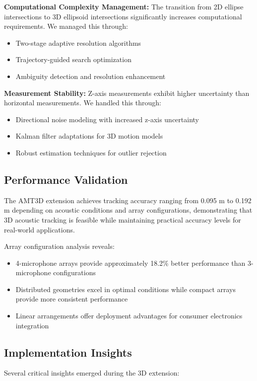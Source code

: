 \documentclass[a4paper]{article}
\begin{document}
{\bf Computational Complexity Management:} The transition from 2D ellipse intersections to 3D ellipsoid intersections significantly increases computational requirements. We managed this through:
\begin{itemize}
\item Two-stage adaptive resolution algorithms
\item Trajectory-guided search optimization
\item Ambiguity detection and resolution enhancement
\end{itemize}

{\bf Measurement Stability:} Z-axis measurements exhibit higher uncertainty than horizontal measurements. We handled this through:
\begin{itemize}
\item Directional noise modeling with increased z-axis uncertainty
\item Kalman filter adaptations for 3D motion models
\item Robust estimation techniques for outlier rejection
\end{itemize}

\subsection{Performance Validation}

The AMT3D extension achieves tracking accuracy ranging from 0.095 m to 0.192 m depending on acoustic conditions and array configurations, demonstrating that 3D acoustic tracking is feasible while maintaining practical accuracy levels for real-world applications.

Array configuration analysis reveals:
\begin{itemize}
\item 4-microphone arrays provide approximately 18.2\% better performance than 3-microphone configurations
\item Distributed geometries excel in optimal conditions while compact arrays provide more consistent performance
\item Linear arrangements offer deployment advantages for consumer electronics integration
\end{itemize}

\subsection{Implementation Insights}

Several critical insights emerged during the 3D extension:
\end{document}
